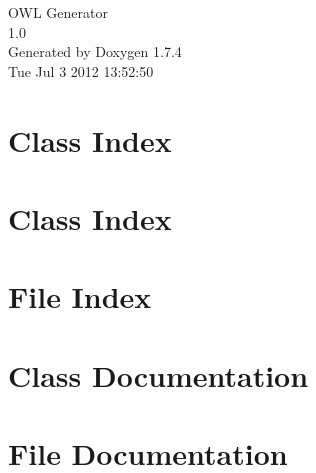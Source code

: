 \documentclass[a4paper]{book}
\begin{document}
\hypersetup{pageanchor=false}
\begin{titlepage}
\vspace*{7cm}
\begin{center}
{\Large OWL Generator \\[1ex]\large 1.0 }\\
\vspace*{1cm}
{\large Generated by Doxygen 1.7.4}\\
\vspace*{0.5cm}
{\small Tue Jul 3 2012 13:52:50}\\
\end{center}
\end{titlepage}
\clearemptydoublepage
{}
\tableofcontents
\clearemptydoublepage
{}
\hypersetup{pageanchor=true}
\chapter{Class Index}

\chapter{Class Index}

\chapter{File Index}

\chapter{Class Documentation}










\chapter{File Documentation}










\printindex
\end{document}
